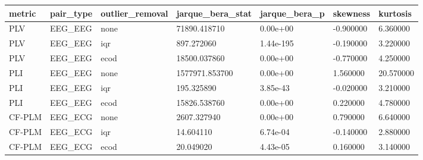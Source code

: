 \begin{tabular}{lllllll}
\toprule
metric & pair\_type & outlier\_removal & jarque\_bera\_stat & jarque\_bera\_p & skewness & kurtosis \\
\midrule
PLV & EEG\_EEG & none & 71890.418710 & 0.00e+00 & -0.900000 & 6.360000 \\
PLV & EEG\_EEG & iqr & 897.272060 & 1.44e-195 & -0.190000 & 3.220000 \\
PLV & EEG\_EEG & ecod & 18500.037860 & 0.00e+00 & -0.770000 & 4.250000 \\
PLI & EEG\_EEG & none & 1577971.853700 & 0.00e+00 & 1.560000 & 20.570000 \\
PLI & EEG\_EEG & iqr & 195.325890 & 3.85e-43 & -0.020000 & 3.210000 \\
PLI & EEG\_EEG & ecod & 15826.538760 & 0.00e+00 & 0.220000 & 4.780000 \\
CF-PLM & EEG\_ECG & none & 2607.327940 & 0.00e+00 & 0.790000 & 6.640000 \\
CF-PLM & EEG\_ECG & iqr & 14.604110 & 6.74e-04 & -0.140000 & 2.880000 \\
CF-PLM & EEG\_ECG & ecod & 20.049020 & 4.43e-05 & 0.160000 & 3.140000 \\
\bottomrule
\end{tabular}
